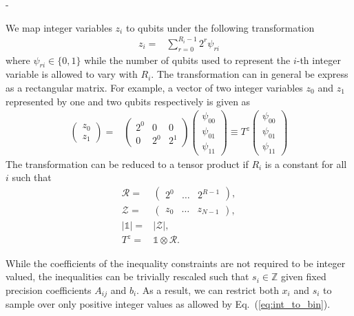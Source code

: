 -\documentclass[prd,twocolumn,tightenlines,preprintnumbers,showpacs,superscriptaddress,notitlepage,nofootinbib,eqsecnum,floatfix,longbibliography]{revtex4}
\begin{document}
We map integer variables $z_i$ to qubits under the following transformation~\cite{Chang:2018uoc}
\begin{align}
    z_i = & \sum_{r=0}^{R_i-1} 2^r \psi_{ri}
\label{eq:int_to_bin}
\end{align}
where $\psi_{ri} \in \{0, 1\}$ while the number of qubits used to represent the $i$-th integer variable is allowed to vary with $R_i$.
The transformation can in general be express as a rectangular matrix.
For example, a vector of two integer variables $z_0$ and $z_1$ represented by one and two qubits respectively is given as
\begin{align}
    \begin{pmatrix}
    z_0\\
    z_1
    \end{pmatrix}
    = &
    \begin{pmatrix}
    2^0 & 0 & 0\\
    0 & 2^0 & 2^1
    \end{pmatrix}
    \begin{pmatrix}
    \psi_{00}\\
    \psi_{01}\\
    \psi_{11}
    \end{pmatrix}
    \equiv T^z \begin{pmatrix}
    \psi_{00}\\
    \psi_{01}\\
    \psi_{11}
    \end{pmatrix}
\end{align}
The transformation can be reduced to a tensor product if $R_i$ is a constant for all $i$ such that
\begin{align}
    \mathcal{R} = & \begin{pmatrix} 2^0 & \dots & 2^{R-1}\end{pmatrix},\\
    \mathcal{Z} = & \begin{pmatrix} z_0 & \dots & z_{N-1}\end{pmatrix},\\
    |\mathds{1}| = & |\mathcal{Z}|,\\
    T^z = & \mathds{1}\otimes \mathcal{R}.
\end{align}

While the coefficients of the inequality constraints are not required to be integer valued, the inequalities can be trivially rescaled such that $s_i \in \mathbb{Z}$ given fixed precision coefficients $A_{ij}$ and $b_i$.
As a result, we can restrict both $x_i$ and $s_i$ to sample over only positive integer values as allowed by Eq.~(\ref{eq:int_to_bin}).
\end{document}
